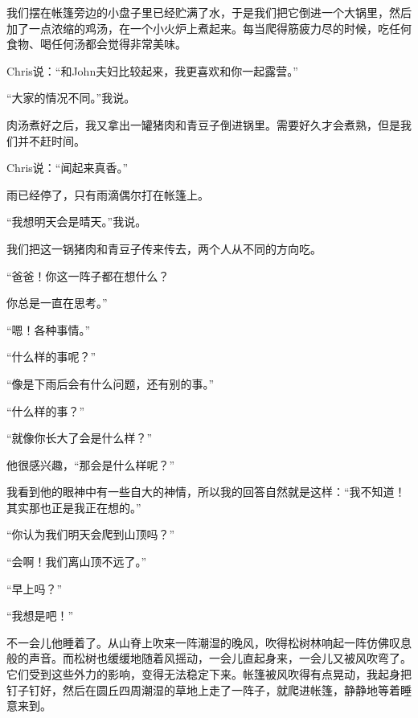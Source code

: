 \documentclass[UTF8]{article}
\begin{document}
\par 我们摆在帐篷旁边的小盘子里已经贮满了水，于是我们把它倒进一个大锅里，然后加了一点浓缩的鸡汤，在一个小火炉上煮起来。每当爬得筋疲力尽的时候，吃任何食物、喝任何汤都会觉得非常美味。
\par Chris说：“和John夫妇比较起来，我更喜欢和你一起露营。”
\par “大家的情况不同。”我说。
\par 肉汤煮好之后，我又拿出一罐猪肉和青豆子倒进锅里。需要好久才会煮熟，但是我们并不赶时间。
\par Chris说：“闻起来真香。”
\par 雨已经停了，只有雨滴偶尔打在帐篷上。
\par “我想明天会是晴天。”我说。
\par 我们把这一锅猪肉和青豆子传来传去，两个人从不同的方向吃。
\par “爸爸！你这一阵子都在想什么？
\par 你总是一直在思考。”
\par “嗯！各种事情。”
\par “什么样的事呢？”
\par “像是下雨后会有什么问题，还有别的事。”
\par “什么样的事？”
\par “就像你长大了会是什么样？”
\par 他很感兴趣，“那会是什么样呢？”
\par 我看到他的眼神中有一些自大的神情，所以我的回答自然就是这样：“我不知道！其实那也正是我正在想的。”
\par “你认为我们明天会爬到山顶吗？”
\par “会啊！我们离山顶不远了。”
\par “早上吗？”
\par “我想是吧！”
\par 不一会儿他睡着了。从山脊上吹来一阵潮湿的晚风，吹得松树林响起一阵仿佛叹息般的声音。而松树也缓缓地随着风摇动，一会儿直起身来，一会儿又被风吹弯了。它们受到这些外力的影响，变得无法稳定下来。帐篷被风吹得有点晃动，我起身把钉子钉好，然后在圆丘四周潮湿的草地上走了一阵子，就爬进帐篷，静静地等着睡意来到。
\end{document}
